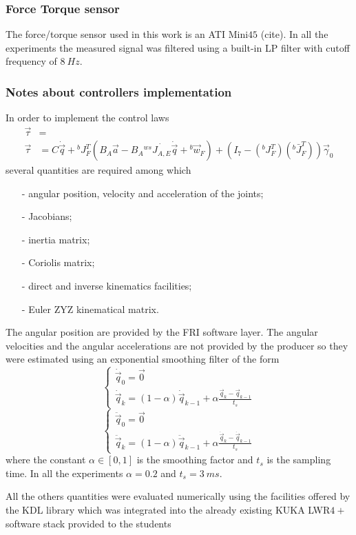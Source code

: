 \subsubsection{Force Torque sensor}
The force/torque sensor used in this work is an ATI Mini$45$ (cite).
In all the experiments the measured signal was filtered using a built-in
LP filter with cutoff frequency of $\SI{8}{Hz}$.

\subsubsection{Notes about controllers implementation}
In order to implement the control laws
\[
\begin{split}
  \vec{\tau} &= \\
  \vec{\tau} &= C \dot{\vec{q}} + {}^{b}J^{T}_{F} ( B_A \vec{a} - B_A {}^{ws} \dot{J_{A,E}} \dot{\vec{q}} + {}^b\vec{w}_{F}) +
  (I_7 - ({}^{b}J^{T}_{F}) ({}^{b} \bar{J}^{T}_{F})) \vec{\gamma}_{0}
\end{split}
\]
several quantities are required among which
\begin{itemize}
\item[-] angular position, velocity and acceleration of the joints;
\item[-] Jacobians;
\item[-] inertia matrix;
\item[-] Coriolis matrix;
\item[-] direct and inverse kinematics facilities;
\item[-] Euler ZYZ kinematical matrix.
\end{itemize}
\par
The angular position are provided by the FRI software layer.
The angular velocities and the angular accelerations are not provided by
the producer so they were estimated using an exponential smoothing filter of the 
form
\[
\begin{cases}
  \dot{\vec{q}}_0 = \vec{0} \\
  \dot{\vec{q}}_k = (1 - \alpha) \dot{\vec{q}}_{k-1} + \alpha \frac{\vec{q}_k - \vec{q}_{k-1}}{t_s}
\end{cases}
\]
\[
\begin{cases}
  \ddot{\vec{q}}_0 = \vec{0} \\
  \ddot{\vec{q}}_k = (1 - \alpha) \ddot{\vec{q}}_{k-1} + \alpha \frac{\dot{\vec{q}}_k - \dot{\vec{q}}_{k-1}}{t_s}
\end{cases}
\]
where the constant $\alpha \in [0, 1]$ is the smoothing factor and $t_s$ is the sampling time.
In all the experiments $\alpha = 0.2$ and $t_s = \SI{3}{ms}$.
\par
All the others quantities were evaluated numerically using the facilities offered by the KDL library which was
integrated into the already existing KUKA LWR$4+$ software stack provided to the students


